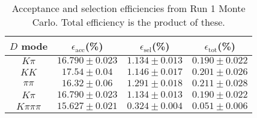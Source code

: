 \begin{table}[H]
    \centering
    \begin{tabular}{cccc}
        \toprule
        $D$ mode & $\epsilon_\mathrm{acc}$(\%) &  $\epsilon_\mathrm{sel}$(\%) &  $\epsilon_\mathrm{tot}$(\%) \\
        \midrule
        $K\pi$ & $16.790 \pm 0.023$ & $1.134 \pm 0.013$ & $0.190 \pm 0.022$ \\
        $KK$ & $17.54 \pm 0.04$ & $1.146 \pm 0.017$ & $0.201 \pm 0.026$ \\
        $\pi\pi$ & $16.32 \pm 0.06$ & $1.291 \pm 0.018$ & $0.211 \pm 0.028$ \\
        $K\pi$ & $16.790 \pm 0.023$ & $1.134 \pm 0.013$ & $0.190 \pm 0.022$ \\
        $K\pi\pi\pi$ & $15.627 \pm 0.021$ & $0.324 \pm 0.004$ & $0.051 \pm 0.006$ \\
        \bottomrule
    \end{tabular}
    \caption{Acceptance and selection efficiencies from  Run 1 Monte Carlo. Total efficiency is the  product of these.}
\label{tab:selection_efficiency_run1}
\end{table}
